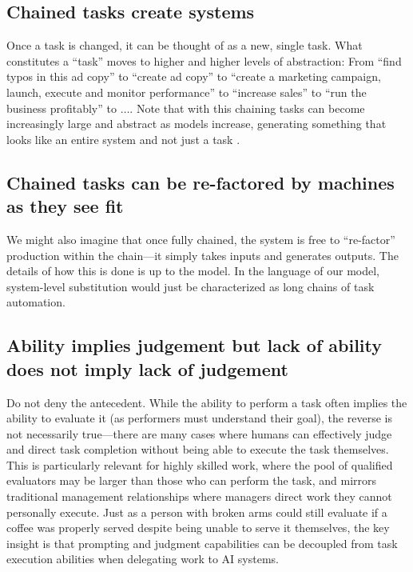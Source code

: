 \documentclass{article}
\theoremstyle{plain}
\theoremstyle{plain}
\begin{document}

\subsection{Chained tasks create systems}
Once a task is changed, it can be thought of as a new, single task.
What constitutes a ``task'' moves to higher and higher levels of abstraction: 
From ``find typos in this ad copy'' to ``create ad copy'' to ``create a marketing campaign, launch, execute and monitor performance'' to ``increase sales'' to ``run the business profitably'' to $\ldots$.  
Note that with this chaining tasks can become increasingly large and abstract as models increase, generating something that looks like an entire system and not just a task \cite{bresnahan2020artificial}.

\subsection{Chained tasks can be re-factored by machines as they see fit}
We might also imagine that once fully chained, the system is free to ``re-factor'' production within the chain---it simply takes inputs and generates outputs.
The details of how this is done is up to the model. 
In the language of our model, system-level substitution would just be characterized as long chains of task automation.


\subsection{Ability implies judgement but lack of ability does not imply lack of judgement}
Do not deny the antecedent.
While the ability to perform a task often implies the ability to evaluate it (as performers must understand their goal), the reverse is not necessarily true---there are many cases where humans can effectively judge and direct task completion without being able to execute the task themselves. 
This is particularly relevant for highly skilled work, where the pool of qualified evaluators may be larger than those who can perform the task, and mirrors traditional management relationships where managers direct work they cannot personally execute. 
Just as a person with broken arms could still evaluate if a coffee was properly served despite being unable to serve it themselves, the key insight is that prompting and judgment capabilities can be decoupled from task execution abilities when delegating work to AI systems.
\end{document}

